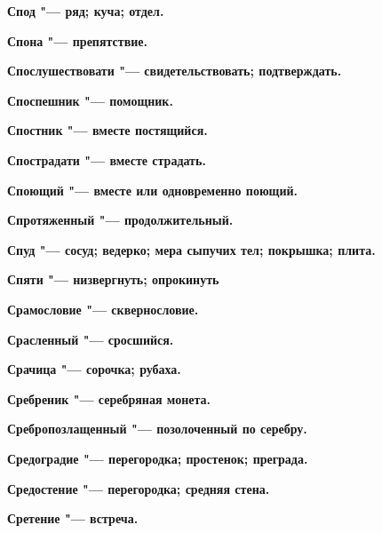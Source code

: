 \begin{mymulticols}{2}
\bfseries Спод\normalfont{} "--- ряд; куча; отдел. 




\bfseries Спона\normalfont{} "--- препятствие. 




\bfseries Спослушествовати\normalfont{} "--- свидетельствовать; подтверждать. 




\bfseries Споспешник\normalfont{} "--- помощник. 




\bfseries Спостник\normalfont{} "--- вместе постящийся. 




\bfseries Спострадати\normalfont{} "--- вместе страдать. 




\bfseries Споющий\normalfont{} "--- вместе или одновременно поющий. 




\bfseries Спротяженный\normalfont{} "--- продолжительный. 




\bfseries Спуд\normalfont{} "--- сосуд; ведерко; мера сыпучих тел; покрышка; плита. 




\bfseries Спяти\normalfont{} "--- низвергнуть; опрокинуть 




\bfseries Срамословие\normalfont{} "--- сквернословие. 




\bfseries Срасленный\normalfont{} "--- сросшийся. 




\bfseries Срачица\normalfont{} "--- сорочка; рубаха. 




\bfseries Сребреник\normalfont{} "--- серебряная монета. 




\bfseries Сребропозлащенный\normalfont{} "--- позолоченный по серебру. 




\bfseries Средоградие\normalfont{} "--- перегородка; простенок; преграда. 




\bfseries Средостение\normalfont{} "--- перегородка; средняя стена. 




\bfseries Сретение\normalfont{} "--- встреча. 





\end{mymulticols}
